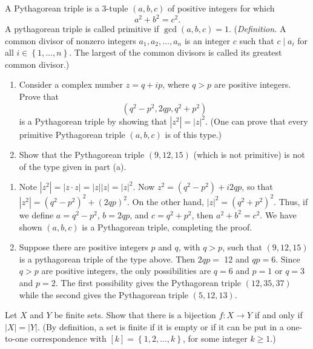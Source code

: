 \begin{questions}
\question
     A Pythagorean triple is a 3-tuple \((a, b, c)\) of positive integers for which
\[
a^2+b^2=c^2.
\] A pythagorean triple is  called primitive if  \(\operatorname{gcd}(a, b, c)=1\). (\textit{Definition.} A common divisor of nonzero integers \(a_1, a_2, \ldots, a_n\) is an integer \(c\) such that \(c \mid a_i\) for all \(i\in \left\{ 1,\dots,n \right\}\). The largest of the common divisors   is called its greatest common divisor.)
\begin{enumerate}[label=(\alph*)]
    \item Consider a complex number \(z=q+i p\), where \(q>p\) are positive integers. Prove that
\[
\left(q^2-p^2, 2 q p, q^2+p^2\right)
\]
is a Pythagorean triple by showing that \(\left|z^2\right|=|z|^2\). (One can prove that every primitive Pythagorean triple \((a, b, c)\) is of this type.)
\item Show that the Pythagorean triple \((9,12,15)\) (which is not primitive) is not of the type given in part (a).

\end{enumerate}
\begin{solution}
\begin{enumerate}[label=(\alph*)]
    \item Note \(|z^2| = |z\cdot z| = |z||z|=|z|^2\).
    Now \(z^2=\left(q^2-p^2\right)+i 2 q p\), so that \(\left|z^2\right|=\left(q^2-p^2\right)^2+(2 q p)^2\). On the other hand, \(|z|^2=\left(q^2+p^2\right)^2\). Thus, if we define \(a=q^2-p^2\), \(b=2 q p\), and \(c=q^2+p^2\), then \(a^2+b^2=c^2\). We have shown  \((a, b, c)\) is a Pythagorean triple, completing the proof.

    \item Suppose there are positive integers \(p\) and \(q\), with \(q>p\), such that  \((9,12,15)\) is a pythagorean triple of the type above. Then \(2 q p=\) 12 and \(q p=6\). Since \(q>p\) are positive integers, the only possibilities are \(q=6\) and \(p=1\) or \(q=3\) and \(p=2\). The first possibility gives the Pythagorean triple \((12,35,37)\) while the second gives the Pythagorean triple \((5,12,13)\).
\end{enumerate}
\end{solution}


\question
    Let \(X\) and \(Y\) be finite sets. Show that there is a bijection \(f\colon X \rightarrow Y\) if and only if \(|X|=|Y|\). (By definition, a set is finite if it is empty or if it can be put in a one-to-one correspondence with \([k] = \left\{ 1,2,\ldots, k \right\}\), for some integer \(k\geq 1\).)


\end{questions}
